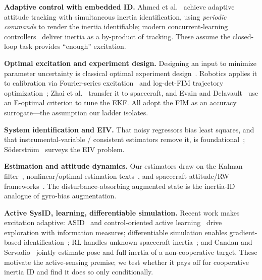 \documentclass[conference]{IEEEtran}
\begin{document}
\textbf{Adaptive control with embedded ID.} Ahmed et al.~\cite{ahmed1998adaptive} achieve adaptive attitude tracking with simultaneous inertia identification, using \emph{periodic commands} to render the inertia identifiable; modern concurrent-learning controllers~\cite{zhao2020finite} deliver inertia as a by-product of tracking. These assume the closed-loop task provides ``enough'' excitation.

\textbf{Optimal excitation and experiment design.} Designing an input to minimize parameter uncertainty is classical optimal experiment design~\cite{fedorov1972theory,pukelsheim2006optimal,goodwin1977dynamic}. Robotics applies it to calibration via Fourier-series excitation~\cite{swevers1997optimal} and log-det-FIM trajectory optimization~\cite{calafiore2001robot}; Zhai et al.~\cite{zhai2017optimal} transfer it to spacecraft, and Evain and Delavault~\cite{evain2024improving} use an E-optimal criterion to tune the EKF. All adopt the FIM as an accuracy surrogate---the assumption our ladder isolates.

\textbf{System identification and EIV.} That noisy regressors bias least squares, and that instrumental-variable / consistent estimators remove it, is foundational~\cite{ljung1999system,soderstrom1989system}; Söderström~\cite{soderstrom2007errors} surveys the EIV problem.

\textbf{Estimation and attitude dynamics.} Our estimators draw on the Kalman filter~\cite{kalman1960new}, nonlinear/optimal-estimation texts~\cite{simon2006optimal,crassidis2011optimal}, and spacecraft attitude/RW frameworks~\cite{markley2014fundamentals}. The disturbance-absorbing augmented state is the inertia-ID analogue of gyro-bias augmentation.

\textbf{Active SysID, learning, differentiable simulation.} Recent work makes excitation adaptive: ASID~\cite{memmel2024asid} and control-oriented active learning~\cite{lee2024active,wagenmaker2020active} drive exploration with information measures; differentiable simulation enables gradient-based identification~\cite{jatavallabhula2021gradsim}; RL handles unknown spacecraft inertia~\cite{enders2021deep,elhariry2025drl}; and Candan and Servadio~\cite{candan2026online} jointly estimate pose and full inertia of a non-cooperative target. These motivate the active-sensing premise; we test whether it pays off for cooperative inertia ID and find it does so only conditionally.
\end{document}
